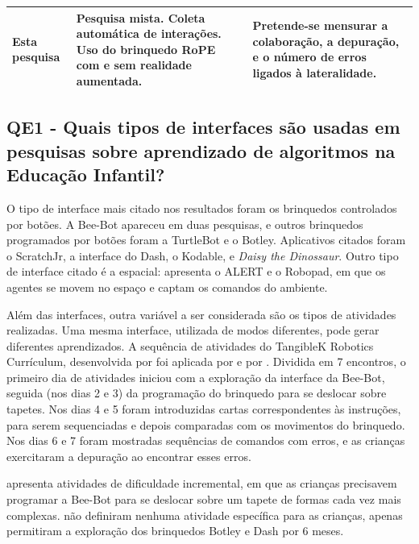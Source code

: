 {\begin{landscape}
\begin{footnotesize}
\begin{longtable}{|p{6cm}|p{8cm}|p{8cm}|}
    Esta pesquisa & Pesquisa mista. Coleta automática de interações. Uso do brinquedo RoPE com e sem realidade aumentada. & Pretende-se mensurar a colaboração, a depuração, e o número de erros ligados à lateralidade. \\ \hline
    
    \end{longtable}   
\end{footnotesize}

\end{landscape}

\subsection{QE1 - Quais tipos de interfaces são usadas em pesquisas sobre aprendizado de algoritmos na Educação Infantil? }

O tipo de interface mais citado nos resultados foram os brinquedos controlados por botões. A Bee-Bot apareceu em duas pesquisas, e outros brinquedos programados por botões foram a TurtleBot e o Botley. Aplicativos citados foram o ScratchJr, a interface do Dash, o Kodable, e \textit{Daisy the Dinossaur}. Outro tipo de interface citado é a espacial:  apresenta o ALERT e o Robopad, em que os agentes se movem no espaço e captam os comandos do ambiente.

Além das interfaces, outra variável a ser considerada são os tipos de atividades realizadas. Uma mesma interface, utilizada de modos diferentes, pode gerar diferentes aprendizados. A sequência de atividades do TangibleK Robotics Currículum, desenvolvida por  foi aplicada por  e por . Dividida em 7 encontros, o primeiro dia de atividades iniciou com a exploração da interface da Bee-Bot, seguida (nos dias 2 e 3) da programação do brinquedo para se deslocar sobre tapetes. Nos dias 4 e 5 foram introduzidas cartas correspondentes às instruções, para serem sequenciadas e depois comparadas com os movimentos do brinquedo. Nos dias 6 e 7 foram mostradas sequências de comandos com erros, e as crianças exercitaram a depuração ao encontrar esses erros.

 apresenta atividades de dificuldade incremental, em que as crianças precisavem programar a Bee-Bot para se deslocar sobre um tapete de formas cada vez mais complexas.  não definiram nenhuma atividade específica para as crianças, apenas permitiram a exploração dos brinquedos Botley e Dash por 6 meses.

}
